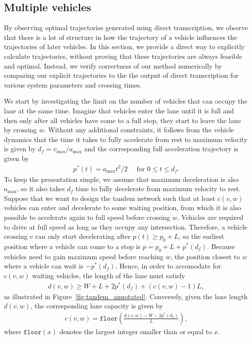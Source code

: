 \documentclass[a4paper]{article}
\theoremstyle{definition}
\theoremstyle{plain}
\begin{document}
\subsection{Multiple vehicles}

By observing optimal trajectories generated using direct transcription, we
observe that there is a lot of structure in how the trajectory of a vehicle
influences the trajectories of later vehicles. In this section, we provide a
direct way to explicitly calculate trajectories, without proving that these
trajectories are always feasible and optimal. Instead, we verify correctness of
our method numerically by comparing our explicit trajectories to the the output
of direct transcription for various system parameters and crossing times.

We start by investigating the limit on the number of vehicles that can occupy
the lane at the same time. Imagine that vehicles enter the lane until it is full
and then only after all vehicles have come to a full stop, they start to leave
the lane by crossing $w$.
%
Without any additional constraints, it follows from the vehicle dynamics that
the time it takes to fully accelerate from rest to maximum velocity is given by
$d_{f} = v_{\max} / a_{\max}$ and the corresponding full acceleration trajectory
is given by
\begin{align*}
  p^{*}(t) = a_{\max} t^{2} / 2 \quad \text{ for } 0 \leq t \leq d_{f} .
\end{align*}
To keep the presentation simple, we assume that maximum deceleration is also
$a_{\max}$, so it also takes $d_{f}$ time to fully decelerate from maximum
velocity to rest.
%
Suppose that we want to design the tandem network such that at least $c(v,w)$
vehicles can enter and decelerate to some waiting position, from which it is
also possible to accelerate again to full speed before crossing $w$.
%
Vehicles are required to drive at full speed as long as they occupy
any intersection. Therefore, a vehicle crossing $v$ can only start decelerating
after $p(t) \geq p_{0} + L$, so the earliest position where a vehicle can come to a
stop is $p = p_{0} + L + p^{*}(d_{f})$.
%
Because vehicles need to gain maximum speed before reaching $w$,
the position closest to $w$ where a vehicle can wait is $- p^{*}(d_{f})$.
%
Hence, in order to accomodate for $c(v,w)$ waiting vehicles, the length of the
lane must satisfy
\begin{align*}
  d(v, w) \geq W + L + 2p^{*}(d_{f}) + (c(v,w) - 1) L ,
\end{align*}
as illustrated in Figure~\ref{fig:tandem_annotated}.
%
Conversely, given the lane length $d(v,w)$, the corresponding lane capacity is
given by
\begin{align*}
  c(v, w) = \texttt{floor}\left( \frac{d(v,w) - W - 2 p^{*}(d_{f})}{L} \right) ,
\end{align*}
where $\texttt{floor}(x)$ denotes the largest integer smaller than or equal to
$x$.
\end{document}
